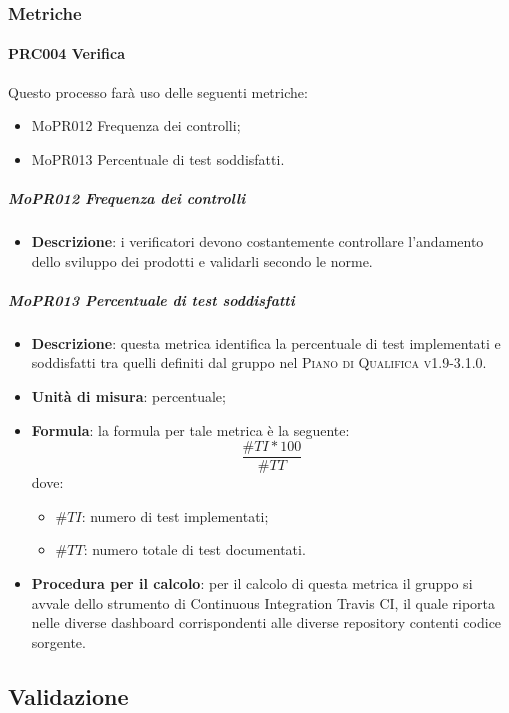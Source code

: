 \documentclass[../norme-di-progetto.tex]{subfiles}
\begin{document}
\subsubsection{Metriche}
\paragraph{PRC004 Verifica}
Questo processo farà uso delle seguenti metriche:
\begin{itemize}
  \item MoPR012 Frequenza dei controlli;
  \item MoPR013 Percentuale di test soddisfatti.
\end{itemize}
\subparagraph{MoPR012 Frequenza dei controlli}
\begin{itemize}
  \item \textbf{Descrizione}: i verificatori devono costantemente controllare l'andamento dello sviluppo dei prodotti e validarli secondo le norme.
\end{itemize}

\subparagraph{MoPR013 Percentuale di test soddisfatti}
\begin{itemize}
  \item \textbf{Descrizione}: questa metrica identifica la percentuale di test implementati e soddisfatti tra quelli definiti dal gruppo nel \textsc{Piano di Qualifica v1.9-3.1.0}.
  \item \textbf{Unità di misura}: percentuale;
  \item \textbf{Formula}: la formula per tale metrica è la seguente:
  \begin{displaymath}
    \frac{\#TI * 100}{\#TT}
  \end{displaymath}
  dove:
  \begin{itemize}
    \item $ \#TI $: numero di test implementati;
    \item $ \#TT $: numero totale di test documentati.
  \end{itemize}
  \item \textbf{Procedura per il calcolo}: per il calcolo di questa metrica il gruppo si avvale dello strumento di Continuous Integration Travis CI, il quale riporta nelle diverse dashboard corrispondenti alle diverse repository contenti codice sorgente.
\end{itemize}

\subsection{Validazione}
\end{document}
